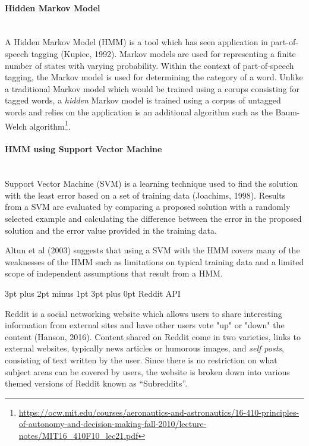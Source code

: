 \documentclass[12pt,a4paper]{article}
\makeatletter
\renewcommand\subsection{\@startsection {subsection}{1}{2mm} %
                               {3pt plus 2pt minus 1pt} %
                               {3pt plus 0pt} %
                               {\normalfont\bfseries}}
\makeatother
\begin{document}
\paragraph{Hidden Markov Model}\mbox{}\\

A Hidden Markov Model (HMM) is a tool which has seen application in part-of-speech tagging (Kupiec, 1992). Markov models are used for representing a finite number of states with varying probability. Within the context of part-of-speech tagging, the Markov model is used for determining the category of a word. Unlike a traditional Markov model which would be trained using a corups consisting for tagged words, a \emph{hidden} Markov model is trained using a corpus of untagged words and relies on the application is an additional algorithm such as the Baum-Welch algorithm\footnote{\url{https://ocw.mit.edu/courses/aeronautics-and-astronautics/16-410-principles-of-autonomy-and-decision-making-fall-2010/lecture-notes/MIT16_410F10_lec21.pdf}}.

\paragraph{HMM using Support Vector Machine}\mbox{}\\

Support Vector Machine (SVM) is a learning technique used to find the solution with the least error based on a set of training data (Joachims, 1998). Results from a SVM are evaluated by comparing a proposed solution with a randomly selected example and calculating the difference between the error in the proposed solution and the error value provided in the training data.

Altun et al (2003) suggests that using a SVM with the HMM covers many of the weaknesses of the HMM such as limitations on typical training data and a limited scope of independent assumptions that result from a HMM.

\subsection{Reddit API}

Reddit is a social networking website which allows users to share interesting information from external sites and have other users vote "up" or "down" the content (Hanson, 2016). Content shared on Reddit come in two varieties, links to external websites, typically news articles or humorous images, and \emph{self posts}, consisting of text written by the user. Since there is no restriction on what subject areas can be covered by users, the website is broken down into various themed versions of Reddit known as ``Subreddits''.
\end{document}
